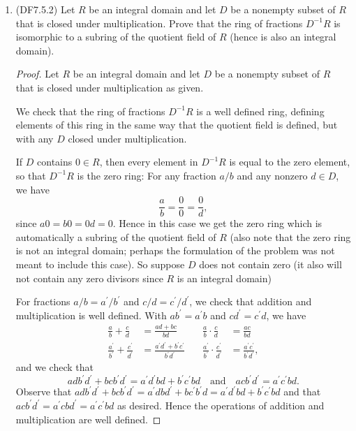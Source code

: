 \documentclass[11pt]{article}
\begin{document}
\begin{enumerate}
    \item (DF7.5.2) Let $R$ be an integral domain and let $D$ be a nonempty subset of $R$ that is closed under multiplication. Prove that the ring of fractions $D^{-1}R$ is isomorphic to a subring of the quotient field of $R$ (hence is also an integral domain).
    \begin{proof} Let $R$ be an integral domain and let $D$ be a nonempty subset of $R$ that is closed under multiplication as given.

      We check that the ring of fractions $D^{-1}R$ is a well defined ring, defining elements of this ring in the same way that the quotient field is defined, but with any $D$ closed under multiplication.

      If $D$ contains $0\in R$, then every element in $D^{-1}{R}$ is equal to the zero element, so that $D^{-1}{R}$ is the zero ring: For any fraction $a/b$ and any nonzero $d\in D$, we have \[\frac{a}{b} = \frac{0}{0} = \frac{0}{d},\] since $a0 = b0 = 0d = 0$. Hence in this case we get the zero ring which is automatically a subring of the quotient field of $R$ (also note that the zero ring is not an integral domain; perhaps the formulation of the problem was not meant to include this case). So suppose $D$ does not contain zero (it also will not contain any zero divisors since $R$ is an integral domain)

      For fractions $a/b = a^{\prime}/b^{\prime}$ and $c/d = c^{\prime}/d^{\prime}$, we check that addition and multiplication is well defined. With $ab^{\prime} = a^{\prime}b$ and $cd^{\prime} = c^{\prime}d$, we have \begin{align*}
        \frac{a}{b} + \frac{c}{d} &= \frac{ad + bc}{bd} &\quad \frac{a}{b}\cdot\frac{c}{d} &= \frac{ac}{bd}\\
        \frac{a^{\prime}}{b^{\prime}}  + \frac{c^{\prime}}{d^{\prime}} &= \frac{a^{\prime}d^{\prime} + b^{\prime}c^{\prime}}{b^{\prime}d^{\prime}} &\quad \frac{a^{\prime}}{b^{\prime}}\cdot\frac{c^{\prime}}{d^{\prime}} &= \frac{a^{\prime}c^{\prime}}{b^{\prime}d^{\prime}},
      \end{align*} and we check that \[adb^{\prime}d^{\prime}+bcb^{\prime}d^{\prime} = a^{\prime}d^{\prime}bd + b^{\prime}c^{\prime}bd \quad \text{and}\quad acb^{\prime}d^{\prime} = a^{\prime}c^{\prime}bd.\] Observe that $adb^{\prime}d^{\prime}+bcb^{\prime}d^{\prime} = a^{\prime}dbd^{\prime}+bc^{\prime}b^{\prime}d = a^{\prime}d^{\prime}bd + b^{\prime}c^{\prime}bd$ and that $acb^{\prime}d^{\prime} = a^{\prime}cbd^{\prime} = a^{\prime}c^{\prime}bd$ as desired. Hence the operations of addition and multiplication are well defined.
      

\end{proof}
\end{enumerate}
\end{document}

